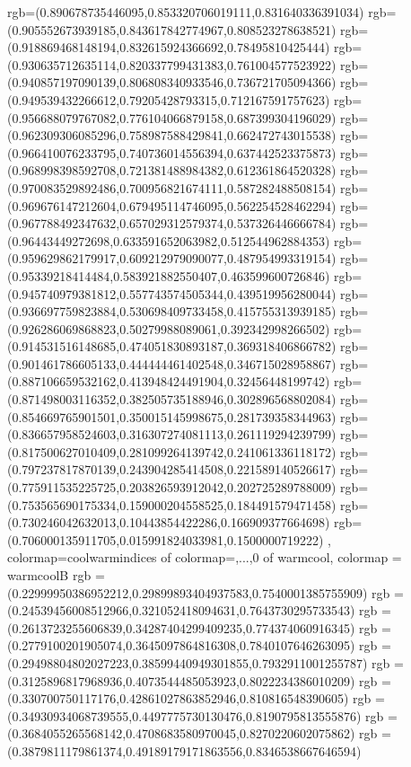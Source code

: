 {{rgb=(0.890678735446095,0.853320706019111,0.831640336391034)
rgb=(0.905552673939185,0.843617842774967,0.808523278638521)
rgb=(0.918869468148194,0.832615924366692,0.78495810425444)
rgb=(0.930635712635114,0.820337799431383,0.761004577523922)
rgb=(0.940857197090139,0.806808340933546,0.736721705094366)
rgb=(0.949539432266612,0.79205428793315,0.712167591757623)
rgb=(0.956688079767082,0.776104066879158,0.687399304196029)
rgb=(0.962309306085296,0.758987588429841,0.662472743015538)
rgb=(0.966410076233795,0.740736014556394,0.637442523375873)
rgb=(0.968998398592708,0.721381488984382,0.612361864520328)
rgb=(0.970083529892486,0.700956821674111,0.587282488508154)
rgb=(0.969676147212604,0.679495114746095,0.562254528462294)
rgb=(0.967788492347632,0.657029312579374,0.537326446666784)
rgb=(0.96443449272698,0.633591652063982,0.512544962884353)
rgb=(0.959629862179917,0.609212979090077,0.487954993319154)
rgb=(0.95339218414484,0.583921882550407,0.463599600726846)
rgb=(0.945740979381812,0.557743574505344,0.439519956280044)
rgb=(0.936697759823884,0.530698409733458,0.415755313939185)
rgb=(0.926286069868823,0.50279988089061,0.392342998266502)
rgb=(0.914531516148685,0.474051830893187,0.369318406866782)
rgb=(0.901461786605133,0.444444461402548,0.346715028958867)
rgb=(0.887106659532162,0.413948424491904,0.32456448199742)
rgb=(0.871498003116352,0.382505735188946,0.302896568802084)
rgb=(0.854669765901501,0.350015145998675,0.281739358344963)
rgb=(0.836657958524603,0.316307274081113,0.261119294239799)
rgb=(0.817500627010409,0.281099264139742,0.241061336118172)
rgb=(0.797237817870139,0.243904285414508,0.221589140526617)
rgb=(0.775911535225725,0.203826593912042,0.202725289788009)
rgb=(0.753565690175334,0.159000204558525,0.184491579471458)
rgb=(0.730246042632013,0.10443854422286,0.166909377664698)
rgb=(0.706000135911705,0.015991824033981,0.1500000719222)
},
colormap={coolwarm}{indices of colormap={,...,0 of warmcool}},
colormap = {warmcoolB}{
rgb =(0.22999950386952212,0.29899893404937583,0.7540001385755909)
rgb =(0.24539456008512966,0.321052418094631,0.7643730295733543)
rgb =(0.2613723255606839,0.34287404299409235,0.774374060916345)
rgb =(0.2779100201905074,0.3645097864816308,0.7840107646263095)
rgb =(0.29498804802027223,0.38599440949301855,0.7932911001255787)
rgb =(0.3125896817968936,0.4073544485053923,0.8022234386010209)
rgb =(0.330700750117176,0.42861027863852946,0.810816548390605)
rgb =(0.34930934068739555,0.4497775730130476,0.8190795813555876)
rgb =(0.3684055265568142,0.4708683580970045,0.8270220602075862)
rgb =(0.3879811179861374,0.49189179171863556,0.8346538667646594)
}}
